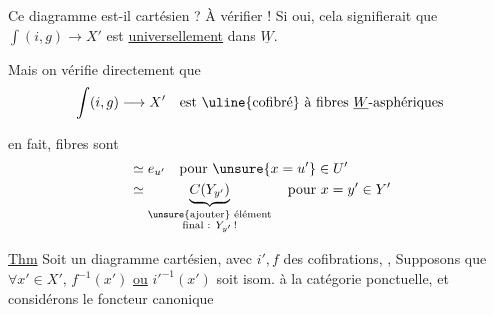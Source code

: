 
Ce diagramme est-il cartésien ? À vérifier ! Si oui, cela signifierait que $\int(i,g)\longrightarrow X'$ est \uline{universellement} dans $\underline W$.

\margin{$\Vert\,|$}
Mais on vérifie directement que
\[
\int(i,g)\longrightarrow X'\quad\text{est \uline{cofibré} à fibres $\underline W$-asphériques}
\]

en fait, fibres sont
\[
\begin{aligned}
&\simeq e_{u'}\quad\text{pour }\unsure{x=u'}\in U'\\
&\simeq\underbrace{C(Y_{y'})}_{\substack{\text{\unsure{ajouter} élément}\\\text{final : }Y_{y'}\,!}}\quad\text{pour }x=y'\in Y'
\end{aligned}
\]


\uline{Thm} Soit
un diagramme cartésien, avec $i',f$ des cofibrations,
,  Supposons
que $\forall x'\in X'$, $f^{-1}(x')$ \uline{ou} $i'^{-1}(x')$ soit isom.
à la catégorie ponctuelle, et considérons le foncteur canonique

